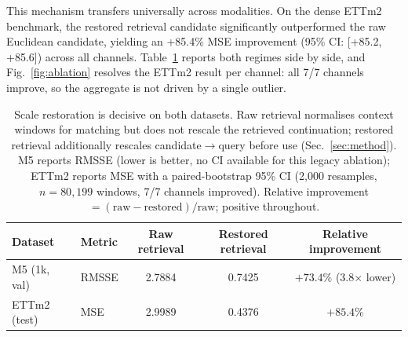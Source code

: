 \documentclass[twocolumn]{svjour3}          %
\begin{document}
This mechanism transfers universally across modalities. On the dense ETTm2 benchmark, the restored retrieval candidate significantly outperformed the raw Euclidean candidate, yielding an +85.4\% MSE improvement (95\% CI: [+85.2, +85.6]) across all channels. Table~\ref{tab:ablation} reports both regimes side by side, and Fig.~\ref{fig:ablation} resolves the ETTm2 result per channel: all 7/7 channels improve, so the aggregate is not driven by a single outlier.

\begin{table}[t]
  \centering
  \caption{Scale restoration is decisive on both datasets. Raw retrieval normalises context
    windows for matching but does not rescale the retrieved continuation; restored retrieval
    additionally rescales candidate$\to$query before use (Sec.~\ref{sec:method}). M5 reports
    RMSSE (lower is better, no CI available for this legacy ablation); ETTm2 reports MSE with
    a paired-bootstrap 95\% CI (2,000 resamples, $n=80{,}199$ windows, 7/7 channels improved).
    Relative improvement $= (\mathrm{raw} - \mathrm{restored}) / \mathrm{raw}$; positive throughout.}
  \label{tab:ablation}
  \begin{tabular}{@{}llccc@{}}
    \toprule
    Dataset & Metric & Raw retrieval & Restored retrieval & Relative improvement \\
    \midrule
    M5 (1k, val)    & RMSSE & 2.7884 & 0.7425 & $+73.4\%$ (3.8$\times$ lower) \\
    ETTm2 (test)    & MSE   & 2.9989 & 0.4376 & $+85.4\%$ \; [$+85.2\%$, $+85.6\%$] \\
    \bottomrule
  \end{tabular}
\end{table}
\end{document}
